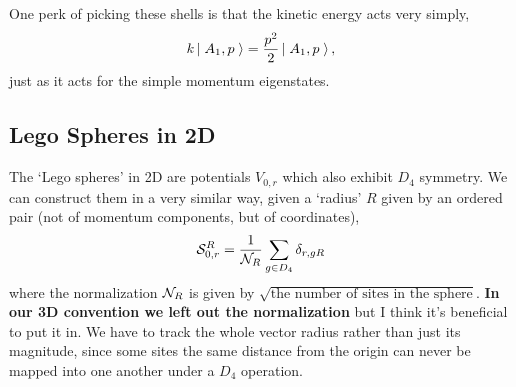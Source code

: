 One perk of picking these shells is that the kinetic energy acts very simply,
\begin{align}
    k \left|\;A_1, p\;\right\rangle = \frac{p^2}{2} \left|\;A_1, p\;\right\rangle,
\end{align}
just as it acts for the simple momentum eigenstates.

\subsection{Lego Spheres in 2D}

The `Lego spheres' in 2D are potentials $V_{0,r}$ which also exhibit $D_4$ symmetry.
We can construct them in a very similar way, given a `radius' $R$ given by an ordered pair (not of momentum components, but of coordinates),
\begin{align}
    \mathcal{S}^{R}_{0,r} = \frac{1}{\mathcal{N}_{R}}\sum_{g \in D_4} \delta_{r, gR}
\end{align}
where the normalization $\mathcal{N}_{R}$ is given by $\sqrt{\textrm{the number of sites in the sphere}}$.
{\bf In our 3D convention we left out the normalization} but I think it's beneficial to put it in.
We have to track the whole vector radius rather than just its magnitude, since some sites the same distance from the origin can never be mapped into one another under a $D_4$ operation.
